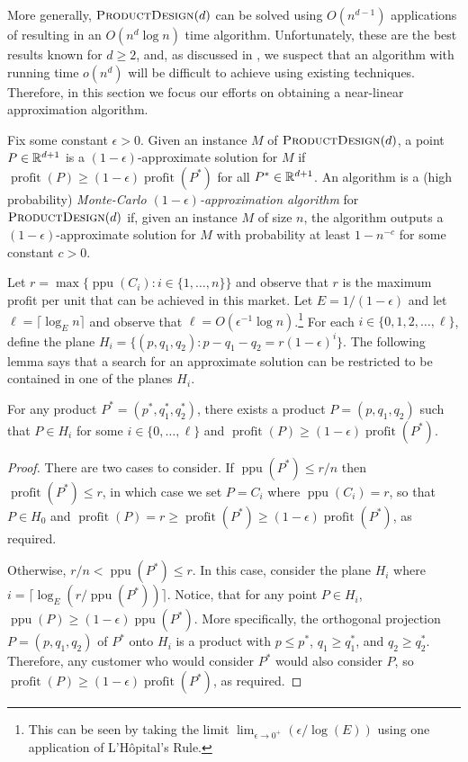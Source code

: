 \documentclass[lotsofwhite]{patmorin}
\newcommand{\ppu}{\operatorname{ppu}}
\newcommand{\val}{\operatorname{profit}}
\newcommand{\eps}{\epsilon}
\begin{document}
More generally, $\textsc{ProductDesign}(d)$ can be solved using
$O(n^{d-1})$ applications of  resulting in an $O(n^d\log n)$
time algorithm.  Unfortunately, these are the best results known for $d \ge
2$, and, as discussed in , we suspect that an algorithm
with running time $o(n^d)$ will be difficult to achieve using existing
techniques.  Therefore, in this section we focus our efforts on obtaining a
near-linear approximation algorithm.

Fix some constant $\epsilon > 0$.  Given an instance $M$ of
$\textsc{ProductDesign}(d)$, a point $P\in\mathbb{R}^{d+1}$ is a
$(1-\eps)$-approximate solution for $M$ if $\val(P) \ge (1-\eps)\val(P^*)$
for all $P^*\in\mathbb{R}^{d+1}$.  An algorithm is a (high probability)
\emph{Monte-Carlo $(1-\eps)$-approximation algorithm} for
$\textsc{ProductDesign}(d)$ if, given an instance $M$ of size $n$, the
algorithm outputs a $(1-\eps)$-approximate solution for $M$ with
probability at least $1-n^{-c}$ for some constant $c>0$.

Let $r=\max\{\ppu(C_i) : i\in\{1,\ldots, n\}\}$ and observe that $r$
is the maximum profit per unit that can be achieved in this market.
Let $E=1/(1-\eps)$ and let $\ell = \lceil\log_E n\rceil$ and observe
that $\ell = O(\eps^{-1}\log n)$.\footnote{This can be seen by taking the
limit $\lim_{\eps\rightarrow 0^+} (\eps/\log(E))$ using one application
of L'H\^opital's Rule.} For each $i\in\{0,1,2,\ldots,\ell\}$, define the
plane $H_i = \{ (p,q_1,q_2) : p-q_1-q_2 = r(1-\eps)^i \}$.  The following
lemma says that a search for an approximate solution can be restricted
to be contained in one of the planes $H_i$.

\begin{lem}
  For any product $P^*=(p^*,q_1^*,q_2^*)$, there exists a product
  $P=(p,q_1,q_2)$ such that $P\in H_i$ for some $i\in\{0,\ldots,\ell\}$
  and $\val(P) \ge (1-\eps)\val(P^*)$.
\end{lem}

\begin{proof}
  There are two cases to consider.  If $\ppu(P^*) \le r/n$ then $\val(P^*)
  \le r$, in which case we set $P=C_i$ where $\ppu(C_i) = r$, so that
  $P\in H_0$ and $\val(P) = r \ge \val(P^*)\ge (1-\eps)\val(P^*)$,
  as required.

  Otherwise, $r/n < \ppu(P^*) \le r$.  In this case, consider the
  plane $H_i$ where $i = \lceil\log_E (r/\ppu(P^*))\rceil$.  Notice,
  that for any point $P\in H_i$, $\ppu(P) \ge (1-\eps)\ppu(P^*)$.
  More specifically, the orthogonal projection $P=(p,q_1,q_2)$ of $P^*$
  onto $H_i$ is a product with $p\le p^*$, $q_1\ge q_1^*$, and $q_2\ge
  q_2^*$.  Therefore, any customer who would consider $P^*$ would also
  consider $P$, so $\val(P) \ge (1-\eps)\val(P^*)$, as required.
\end{proof}
\end{document}
